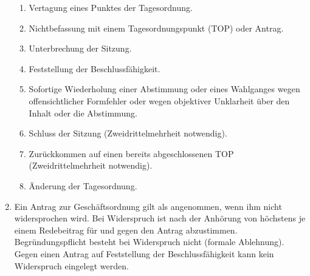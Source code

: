 \begin{enumerate}
\begin{enumerate}
		\item Vertagung eines Punktes der Tagesordnung.
		\item Nichtbefassung mit einem Tagesordnungspunkt (TOP) oder Antrag.
		\item Unterbrechung der Sitzung.
		\item Feststellung der Beschlussfähigkeit.
		\item Sofortige Wiederholung einer Abstimmung oder eines Wahlganges wegen offensichtlicher Formfehler oder wegen objektiver Unklarheit über den Inhalt oder die Abstimmung.
		\item Schluss der Sitzung (Zweidrittelmehrheit notwendig).
		\item Zurückkommen auf einen bereits abgeschlossenen TOP (Zweidrittelmehrheit notwendig).
		\item Änderung der Tagesordnung.
	\end{enumerate}
	\item Ein Antrag zur Geschäftsordnung gilt als angenommen, wenn ihm nicht widersprochen wird.
	Bei Widerspruch ist nach der Anhörung von höchstens je einem Redebeitrag für und gegen den Antrag abzustimmen.
	Begründungspflicht besteht bei Widerspruch nicht (formale Ablehnung).
	Gegen einen Antrag auf Feststellung der Beschlussfähigkeit kann kein Widerspruch eingelegt werden.
\end{enumerate}

